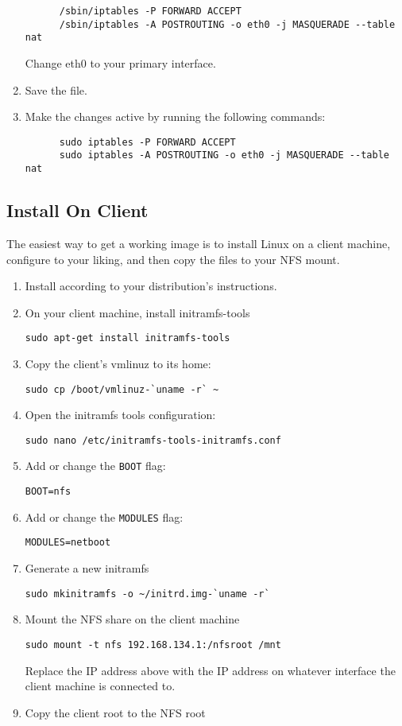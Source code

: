 \documentclass{article}
\begin{document}
\begin{flushleft}
\begin{enumerate}
    \begin{verbatim}
      /sbin/iptables -P FORWARD ACCEPT
      /sbin/iptables -A POSTROUTING -o eth0 -j MASQUERADE --table nat   \end{verbatim}
    Change eth0 to your primary interface.
    \item Save the file.
    \item Make the changes active by running the following commands:
    \begin{verbatim}
      sudo iptables -P FORWARD ACCEPT
      sudo iptables -A POSTROUTING -o eth0 -j MASQUERADE --table nat
    \end{verbatim}
  \end{enumerate}
\subsection{Install On Client}
The easiest way to get a working image is to install Linux on a client machine, configure to your liking, and then copy the files to your NFS mount.

\begin{enumerate}
  \item Install according to your distribution's instructions.
  \item On your client machine, install initramfs-tools

  \verb|sudo apt-get install initramfs-tools|
  \item Copy the client's vmlinuz to its home:

  \verb|sudo cp /boot/vmlinuz-`uname -r` ~|

  \item Open the initramfs tools configuration:

  \verb|sudo nano /etc/initramfs-tools-initramfs.conf|
  \item Add or change the \verb|BOOT| flag:

  \verb|BOOT=nfs|
  \item Add or change the \verb|MODULES| flag:

  \verb|MODULES=netboot|
  \item Generate a new initramfs

  \verb|sudo mkinitramfs -o ~/initrd.img-`uname -r`|
  \item Mount the NFS share on the client machine

  \verb|sudo mount -t nfs 192.168.134.1:/nfsroot /mnt|

  Replace the IP address above with the IP address on whatever interface the client machine is connected to.
  \item Copy the client root to the NFS root


\end{enumerate}
\end{flushleft}
\end{document}
